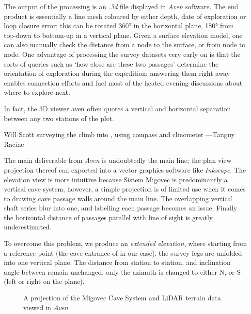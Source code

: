 The output of the processing is an \emph{.3d} file displayed in \emph{Aven} software. The end product is essentially a line mesh coloured by either depth, date of exploration or loop closure error; this can be rotated 360° in the horizontal plane, 180° from top-down to bottom-up in a vertical plane. Given a surface elevation model, one can also manually check the distance from a node to the surface, or from node to node. One advantage of processing the survey datasets very early on is that the sorts of queries such as `how close are these two passages' determine the orientation of exploration during the expedition; answering them right away enables connection efforts and fuel most of the heated evening discussions about where to explore next.

In fact, the 3D viewer aven often quotes a vertical and horizontal separation between any two stations of the plot.

\begin{marginfigure}
\checkoddpage \ifoddpage \forcerectofloat \else \forceversofloat \fi
\centering
 \caption{Will Scott surveying the climb into \protect{}, using compass and clinometer ---Tanguy Racine}
 \label{surveying colony}
\end{marginfigure}

The main deliverable from \emph{Aven} is undoubtedly the main line; the plan view projection thereof can exported into a vector graphics software like \emph{Inkscape}. The elevation view is more intuitive because Sistem Migovec is predominantly a vertical cave system; however, a simple projection is of limited use when it comes to drawing cave passage walls around the main line. The overlapping vertical shaft series blur into one, and labelling each passage becomes an issue. Finally the horizontal distance of passages parallel with line of sight is greatly underestimated.

To overcome this problem, we produce an \emph{extended elevation}, where starting from a reference point (the cave entrance of  in our case), the survey legs are unfolded into one vertical plane. The distance from station to station, and inclination angle between remain unchanged, only the azimuth is changed to either N, or S (left or right on the plane). 


\begin{figure}[t!]
 \checkoddpage \ifoddpage \forcerectofloat \else \forceversofloat \fi
\centering
{}
\caption{A projection of the Migovec Cave System and LiDAR terrain data viewed in \emph{Aven}}
\label{projection}
\end{figure}


